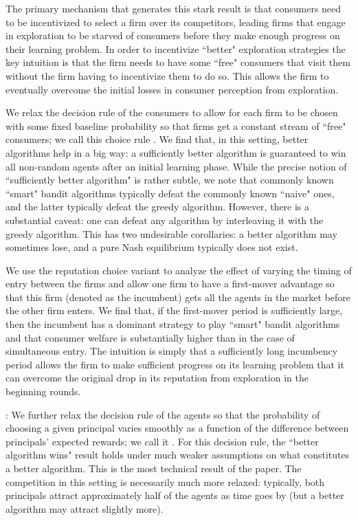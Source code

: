 The primary mechanism that generates this stark result is that consumers need to be incentivized to select a firm over its competitors, leading firms that engage in exploration to be starved of consumers before they make enough progress on their learning problem. In order to incentivize ``better" exploration strategies the key intuition is that the firm needs to have some ``free" consumers that visit them without the firm having to incentivize them to do so. This allows the firm to eventually overcome the initial losses in consumer perception from exploration.

We relax the decision rule of the consumers to allow for each firm to be chosen with some fixed baseline probability so that firms get a constant stream of ``free" consumers; we call this choice rule \HardMaxRandom. We find that, in this setting, better algorithms help in a big way: a sufficiently better algorithm is guaranteed to win all non-random agents after an initial learning phase. While the precise notion of ``sufficiently better algorithm" is rather subtle, we note that commonly known ``smart" bandit algorithms typically defeat the commonly known ``naive" ones, and the latter typically defeat the greedy algorithm. However, there is a substantial caveat: one can defeat any algorithm by interleaving it with the greedy algorithm. This has two undesirable corollaries: a better algorithm may sometimes lose, and a pure Nash equilibrium typically does not exist.

We use the reputation choice variant to analyze the effect of varying the timing of entry between the firms and allow one firm to have a first-mover advantage so that this firm (denoted as the incumbent) gets all the agents in the market before the other firm enters. We find that, if the first-mover period is sufficiently large, then the incumbent has a dominant strategy to play ``smart" bandit algorithms and that consumer welfare is substantially higher than in the case of simultaneous entry. The intuition is simply that a sufficiently long incumbency period allows the firm to make sufficient progress on its learning problem that it can overcome the original drop in its reputation from exploration in the beginning rounds.


: We further relax the decision rule of the agents so that the probability of choosing a given principal varies smoothly as a function of the difference between  principals' expected rewards; we call it \SoftMaxRandom. For this decision rule, the ``better algorithm wins" result holds under much weaker assumptions on what constitutes a better algorithm. This is the most technical result of the paper. The competition in this setting is necessarily much more relaxed: typically, both principals attract approximately half of the agents as time goes by (but a better algorithm may attract slightly more).

